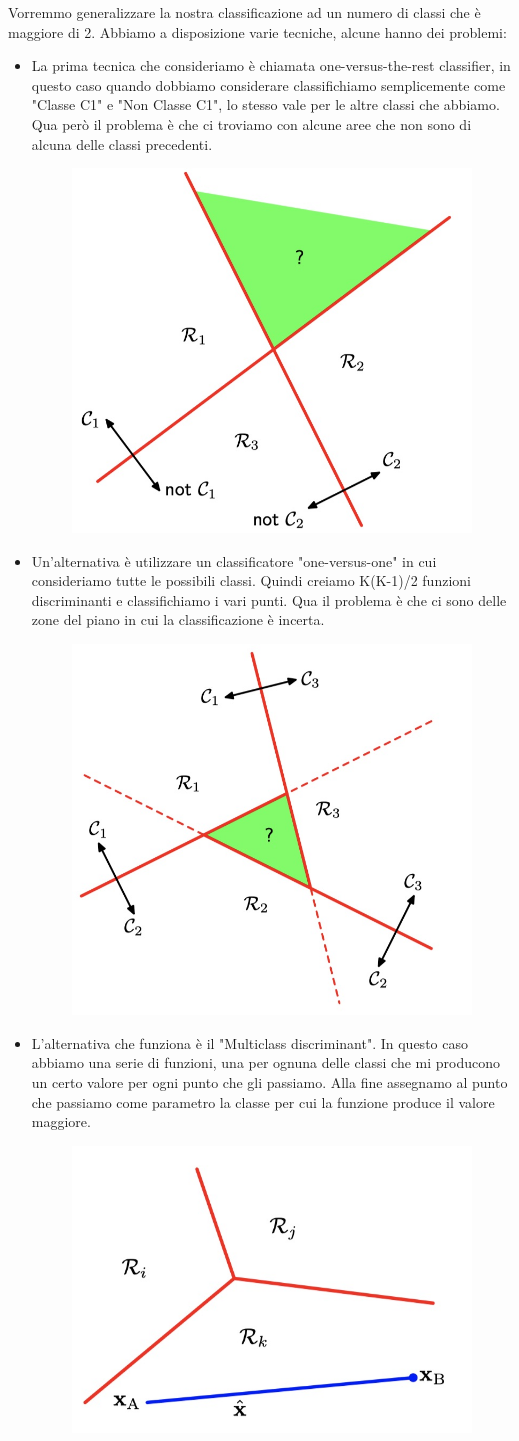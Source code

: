 \documentclass[14pt]{extreport}
\begin{document}
Vorremmo generalizzare la nostra classificazione ad un numero di classi che è maggiore di 2. Abbiamo a disposizione varie tecniche, alcune hanno dei
problemi:

\begin{itemize}
\item La prima tecnica che consideriamo è chiamata one-versus-the-rest classifier, in questo caso quando dobbiamo considerare classifichiamo
semplicemente come "Classe C1" e "Non Classe C1", lo stesso vale per le altre classi che abbiamo. Qua però il problema è che ci troviamo con alcune
aree che non sono di alcuna delle classi precedenti.
\begin{figure}[H]
\centering
\includegraphics[width=0.3\linewidth]{148.jpeg}
\end{figure}
\item Un'alternativa è utilizzare un classificatore "one-versus-one" in cui consideriamo tutte le possibili classi. Quindi creiamo K(K-1)/2 funzioni
discriminanti e classifichiamo i vari punti. Qua il problema è che ci sono delle zone del piano in cui la classificazione è incerta.\begin{figure}[H]
\centering
\includegraphics[width=0.3\linewidth]{149.jpeg}
\end{figure}
\item L'alternativa che funziona è il "Multiclass discriminant". In questo caso abbiamo una serie di funzioni, una per ognuna delle classi che mi
producono un certo valore per ogni punto che gli passiamo. Alla fine assegnamo al punto che passiamo come parametro la classe per cui la funzione
produce il valore maggiore.\begin{figure}[H]
\centering
\includegraphics[width=0.3\linewidth]{150.jpeg}
\end{figure} 
\end{itemize}
\end{document}
